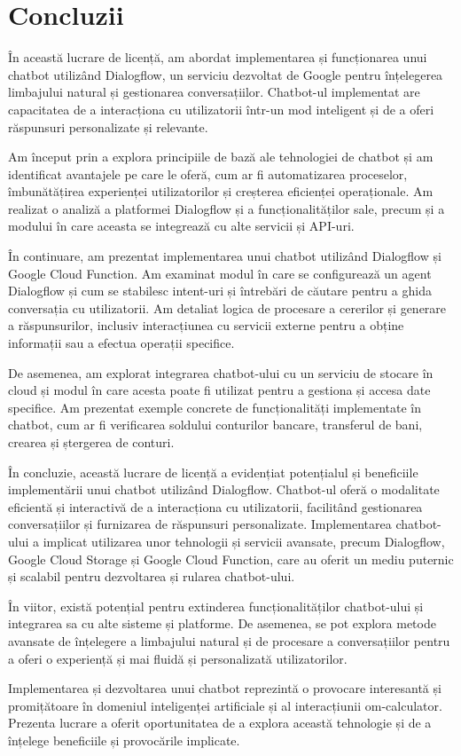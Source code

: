 \chapter{Concluzii}

În această lucrare de licență, am abordat implementarea și funcționarea unui chatbot utilizând Dialogflow, un serviciu dezvoltat de Google pentru înțelegerea limbajului natural și gestionarea conversațiilor. Chatbot-ul implementat are capacitatea de a interacționa cu utilizatorii într-un mod inteligent și de a oferi răspunsuri personalizate și relevante.

Am început prin a explora principiile de bază ale tehnologiei de chatbot și am identificat avantajele pe care le oferă, cum ar fi automatizarea proceselor, îmbunătățirea experienței utilizatorilor și creșterea eficienței operaționale. Am realizat o analiză a platformei Dialogflow și a funcționalităților sale, precum și a modului în care aceasta se integrează cu alte servicii și API-uri.

În continuare, am prezentat implementarea unui chatbot utilizând Dialogflow și Google Cloud Function. Am examinat modul în care se configurează un agent Dialogflow și cum se stabilesc intent-uri și întrebări de căutare pentru a ghida conversația cu utilizatorii. Am detaliat logica de procesare a cererilor și generare a răspunsurilor, inclusiv interacțiunea cu servicii externe pentru a obține informații sau a efectua operații specifice.

De asemenea, am explorat integrarea chatbot-ului cu un serviciu de stocare în cloud și modul în care acesta poate fi utilizat pentru a gestiona și accesa date specifice. Am prezentat exemple concrete de funcționalități implementate în chatbot, cum ar fi verificarea soldului conturilor bancare, transferul de bani, crearea și ștergerea de conturi.

În concluzie, această lucrare de licență a evidențiat potențialul și beneficiile implementării unui chatbot utilizând Dialogflow. Chatbot-ul oferă o modalitate eficientă și interactivă de a interacționa cu utilizatorii, facilitând gestionarea conversațiilor și furnizarea de răspunsuri personalizate. Implementarea chatbot-ului a implicat utilizarea unor tehnologii și servicii avansate, precum Dialogflow, Google Cloud Storage și Google Cloud Function, care au oferit un mediu puternic și scalabil pentru dezvoltarea și rularea chatbot-ului.

În viitor, există potențial pentru extinderea funcționalităților chatbot-ului și integrarea sa cu alte sisteme și platforme. De asemenea, se pot explora metode avansate de înțelegere a limbajului natural și de procesare a conversațiilor pentru a oferi o experiență și mai fluidă și personalizată utilizatorilor.

Implementarea și dezvoltarea unui chatbot reprezintă o provocare interesantă și promițătoare în domeniul inteligenței artificiale și al interacțiunii om-calculator. Prezenta lucrare a oferit oportunitatea de a explora această tehnologie și de a înțelege beneficiile și provocările implicate.